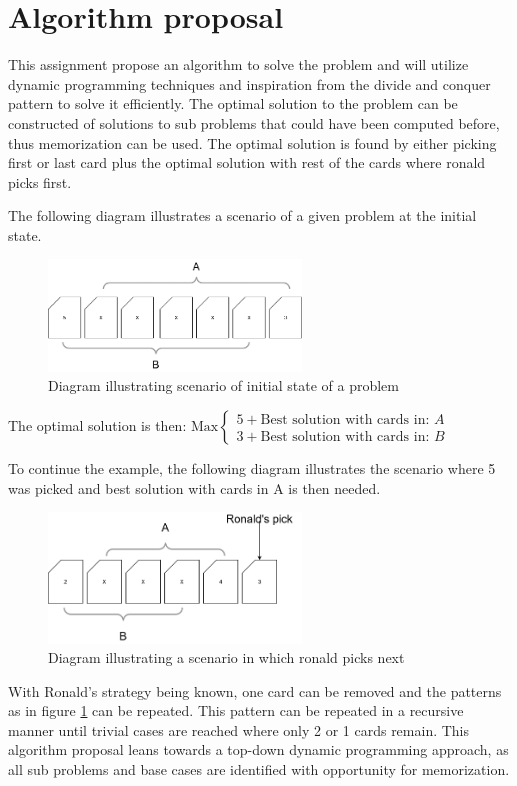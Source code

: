 \section{Algorithm proposal}
This assignment propose an algorithm to solve the problem and will utilize dynamic programming techniques and inspiration from the divide and conquer pattern to solve it efficiently.
The optimal solution to the problem can be constructed of solutions to sub problems that could have been computed before, thus memorization can be used.
The optimal solution is found by either picking first or last card plus the optimal solution with rest of the cards where ronald picks first.


The following diagram illustrates a scenario of a given problem at the initial state.
\begin{figure}[H]
    \centering
    \includegraphics[width=0.6\textwidth]{images/diagram1.png}
    \caption{Diagram illustrating scenario of initial state of a problem}
    \label{fig:D1}
\end{figure}
The optimal solution is then: $\text{Max}\begin{cases}
    5 + \text{Best solution with cards in: }A \\
    3 + \text{Best solution with cards in: }B
\end{cases} $

To continue the example, the following diagram illustrates the scenario where 5 was picked and best solution with cards in A is then needed.
\begin{figure}[H]
    \centering
    \includegraphics[width=0.6\textwidth]{images/diagram2.png}
    \caption{Diagram illustrating a scenario in which ronald picks next}
    \label{fig:D2}
\end{figure}

With Ronald's strategy being known, one card can be removed and the patterns as in figure \ref*{fig:D1} can be repeated.
This pattern can be repeated in a recursive manner until trivial cases are reached where only 2 or 1 cards remain. 
This algorithm proposal leans towards a top-down dynamic programming approach, as all sub problems and base cases are identified with opportunity for memorization.

